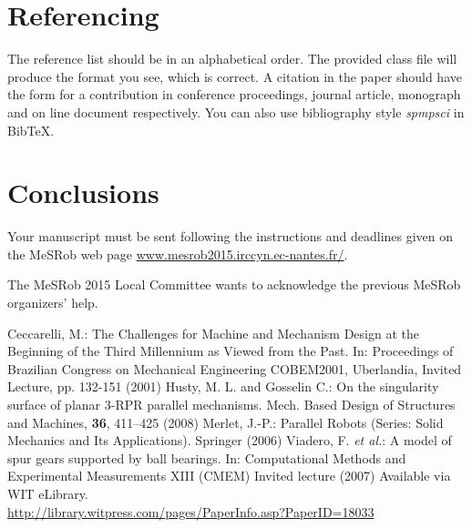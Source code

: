 \documentclass{svmult}
\begin{document}
\section{Referencing}

The reference list should be in an alphabetical order. The provided
class file will produce the format you see, which is correct. A citation
in the paper should have the form \cite{contrib,journal,mono,online} for a contribution in conference proceedings, journal article, monograph and on line document respectively. You can also use bibliography style \textit{spmpsci} in BibTeX.


\section{Conclusions}
Your manuscript must be sent following the instructions and deadlines given on the MeSRob web page \url{www.mesrob2015.irccyn.ec-nantes.fr/}.

\begin{acknowledgement}
The MeSRob 2015 Local Committee wants to acknowledge the previous MeSRob organizers' help.
\end{acknowledgement}

\begin{thebibliography}{99.}

 Ceccarelli, M.: The Challenges for Machine and Mechanism Design at the Beginning of the Third Millennium as Viewed from the Past. In:  Proceedings of Brazilian Congress on Mechanical Engineering COBEM2001, Uberlandia, Invited Lecture, pp. 132-151 (2001)
 Husty, M. L. and Gosselin C.: On the singularity surface of planar 3-RPR parallel mechanisms. Mech. Based Design of Structures and Machines, \textbf{36}, 411--425 (2008)
 Merlet, J.-P.: Parallel Robots (Series: Solid Mechanics and Its Applications). Springer (2006)
 Viadero, F. \textit{et al.}: A model of spur gears supported by ball bearings. In: Computational Methods and Experimental Measurements XIII (CMEM) Invited lecture (2007) Available via WIT eLibrary. \\
\url{http://library.witpress.com/pages/PaperInfo.asp?PaperID=18033}

\end{thebibliography}

%
%
\end{document}
